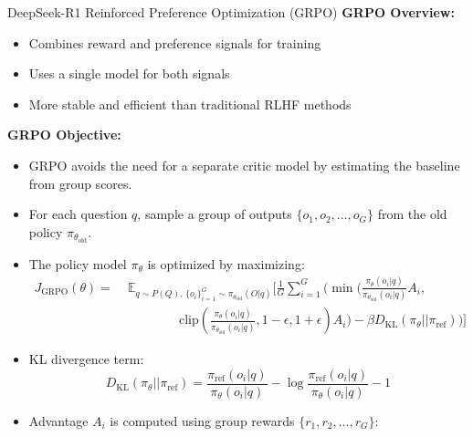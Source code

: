 \begin{frame}[allowframebreaks]{DeepSeek-R1 Reinforced Preference Optimization (GRPO)}
    \textbf{GRPO Overview:}
    \begin{itemize}
        \item Combines reward and preference signals for training
        \item Uses a single model for both signals
        \item More stable and efficient than traditional RLHF methods
    \end{itemize}
\framebreak
    \textbf{GRPO Objective:}

    \begin{itemize}
        \item GRPO avoids the need for a separate critic model by estimating the baseline from group scores.
        \item For each question $q$, sample a group of outputs $\{o_1, o_2, \ldots, o_G\}$ from the old policy $\pi_{\theta_{\text{old}}}$.
        \item The policy model $\pi_\theta$ is optimized by maximizing:
        \begin{equation}
        \begin{split}
            J_{\text{GRPO}}(\theta) =\; & \mathbb{E}_{q \sim P(Q),\, \{o_i\}_{i=1}^G \sim \pi_{\theta_{\text{old}}}(O|q)} \Bigg[
            \frac{1}{G} \sum_{i=1}^G \Bigg(
                \min \Bigg(
                    \frac{\pi_\theta(o_i|q)}{\pi_{\theta_{\text{old}}}(o_i|q)} A_i, \\
                & \qquad\qquad
                    \text{clip}\left(\frac{\pi_\theta(o_i|q)}{\pi_{\theta_{\text{old}}}(o_i|q)}, 1-\epsilon, 1+\epsilon\right) A_i
                \Bigg)
                - \beta D_{\text{KL}}(\pi_\theta || \pi_{\text{ref}})
            \Bigg)
            \Bigg]
        \end{split}
        \end{equation}
    \framebreak
        \item KL divergence term:
        \begin{equation}
            D_{\text{KL}}(\pi_\theta || \pi_{\text{ref}}) =
            \frac{\pi_{\text{ref}}(o_i|q)}{\pi_\theta(o_i|q)} - \log \frac{\pi_{\text{ref}}(o_i|q)}{\pi_\theta(o_i|q)} - 1
        \end{equation}
        \item Advantage $A_i$ is computed using group rewards $\{r_1, r_2, \ldots, r_G\}$:
        \begin{equation}

\end{equation}
\end{itemize}
\end{frame}
